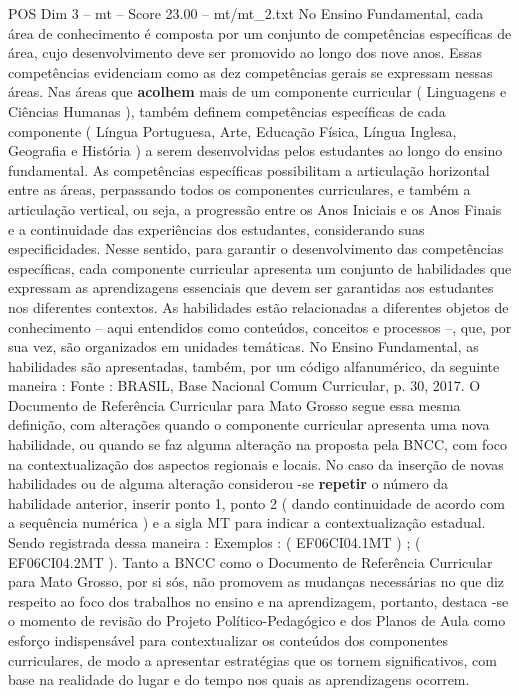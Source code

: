 \begin{textsample}{POS Dim 3 – mt – Score 23.00 – mt/mt\_2.txt}
No Ensino Fundamental, cada área de conhecimento é composta por um conjunto de competências específicas de área, cujo desenvolvimento deve ser promovido ao longo dos nove anos.
Essas competências evidenciam como as dez competências gerais se expressam nessas áreas.
Nas áreas que \textbf{acolhem} mais de um componente curricular ( Linguagens e Ciências Humanas ), também definem competências específicas de cada componente ( Língua Portuguesa, Arte, Educação Física, Língua Inglesa, Geografia e História ) a serem desenvolvidas pelos estudantes ao longo do ensino fundamental.
As competências específicas possibilitam a articulação horizontal entre as áreas, perpassando todos os componentes curriculares, e também a articulação vertical, ou seja, a progressão entre os Anos Iniciais e os Anos Finais e a continuidade das experiências dos estudantes, considerando suas especificidades.
Nesse sentido, para garantir o desenvolvimento das competências específicas, cada componente curricular apresenta um conjunto de habilidades que expressam as aprendizagens essenciais que devem ser garantidas aos estudantes nos diferentes contextos.
As habilidades estão relacionadas a diferentes objetos de conhecimento – aqui entendidos como conteúdos, conceitos e processos –, que, por sua vez, são organizados em unidades temáticas.
No Ensino Fundamental, as habilidades são apresentadas, também, por um código alfanumérico, da seguinte maneira : Fonte : BRASIL, Base Nacional Comum Curricular, p. 30, 2017.
O Documento de Referência Curricular para Mato Grosso segue essa mesma definição, com alterações quando o componente curricular apresenta uma nova habilidade, ou quando se faz alguma alteração na proposta pela BNCC, com foco na contextualização dos aspectos regionais e locais.
No caso da inserção de novas habilidades ou de alguma alteração considerou -se \textbf{repetir} o número da habilidade anterior, inserir ponto 1, ponto 2 ( dando continuidade de acordo com a sequência numérica ) e a sigla MT para indicar a contextualização estadual.
Sendo registrada dessa maneira : Exemplos : ( EF06CI04.1MT ) ; ( EF06CI04.2MT ).
Tanto a BNCC como o Documento de Referência Curricular para Mato Grosso, por si sós, não promovem as mudanças necessárias no que diz respeito ao foco dos trabalhos no ensino e na aprendizagem, portanto, destaca -se o momento de revisão do Projeto Político-Pedagógico e dos Planos de Aula como esforço indispensável para contextualizar os conteúdos dos componentes curriculares, de modo a apresentar estratégias que os tornem significativos, com base na realidade do lugar e do tempo nos quais as aprendizagens ocorrem.

\end{textsample}
